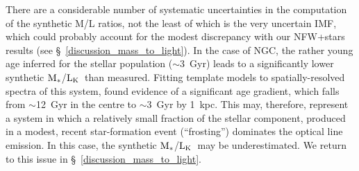 \documentclass{emulateapj}
\newcommand{\mstars}{${\rm M_{*}}$}
\newcommand{\lk }{${\rm L_K}$}
\newcommand{\thin}{\thinspace}
\begin{document}
There are a considerable number of systematic uncertainties
in the computation of the synthetic M/L ratios, not the least
of which is the very uncertain IMF, which could
probably account for the modest discrepancy with our NFW+stars
results (see \S~\ref{discussion_mass_to_light}).
In the case of NGC\thin 720, the rather young age inferred for
the stellar population ($\sim$3~Gyr) leads to a significantly lower
synthetic \mstars/\lk\ than measured. Fitting template models
to spatially-resolved spectra of this system, \citet{rembold05a}
found evidence of a significant age gradient, which falls from
$\sim$12~Gyr in the centre to $\sim$3~Gyr by 1~kpc. This may, therefore,
represent a system in which a relatively small fraction of the 
stellar component, produced in a modest,  recent star-formation
event (``frosting'') dominates the optical line emission. In this case,
the synthetic \mstars/\lk\ may be underestimated. We return to this issue
in \S~\ref{discussion_mass_to_light}.
\end{document}
